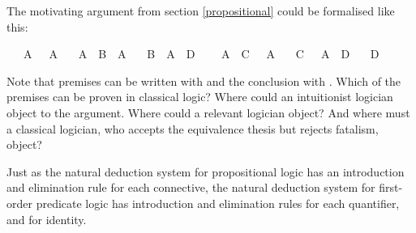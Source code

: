 \begin{isabellebody}
\begin{isamarkuptext}
\end{isamarkuptext}\isamarkuptrue%
%
\begin{isamarkuptext}%
\begin{Exercise}[title = The Air Raid] The motivating argument from section \ref{propositional} could be formalised like this: \end{Exercise}%
\end{isamarkuptext}\isamarkuptrue%
\isamarkupfalse%
\isanewline
\ \ \ {\isachardoublequoteopen}A\ {\isasymor}\ {\isasymnot}\ A{\isachardoublequoteclose}\isanewline
\ \ \ {\isachardoublequoteopen}A\ {\isasymlongrightarrow}\ B\ {\isasymlongrightarrow}\ A{\isachardoublequoteclose}\isanewline
\ \ \ {\isachardoublequoteopen}{\isacharparenleft}B\ {\isasymlongrightarrow}\ A{\isacharparenright}\ {\isasymlongrightarrow}\ D{\isachardoublequoteclose}\isanewline
\ \ \ {\isachardoublequoteopen}{\isasymnot}\ A\ {\isasymlongrightarrow}\ C\ {\isasymlongrightarrow}\ {\isasymnot}\ A{\isachardoublequoteclose}\isanewline
\ \ \ {\isachardoublequoteopen}{\isacharparenleft}C\ {\isasymlongrightarrow}\ {\isasymnot}\ A{\isacharparenright}\ {\isasymlongrightarrow}\ D{\isachardoublequoteclose}\isanewline
\ \ \ {\isachardoublequoteopen}D{\isachardoublequoteclose}%
\isadelimproof
\ %
\endisadelimproof
%
\isatagproof
{}\isamarkupfalse%
%
\endisatagproof
{\isafoldproof}%
%
\isadelimproof
%
\endisadelimproof
%
\begin{isamarkuptext}%
Note that premises can be written with  and the conclusion with .
Which of the premises can be proven in classical logic? Where could an intuitionist logician object to
the argument. Where could a relevant logician object? And where must a classical logician, who accepts
the equivalence thesis but rejects fatalism, object?%
\end{isamarkuptext}\isamarkuptrue%
%
\isamarkuptrue%
%
\begin{isamarkuptext}%
Just as the natural deduction system for propositional logic has an introduction and elimination 
rule for each connective, the natural deduction system for first-order predicate logic has introduction and elimination
rules for each quantifier, and for identity.%
\end{isamarkuptext}\isamarkuptrue%
%
\isamarkuptrue%
%
\begin{isamarkuptext}%

\end{isamarkuptext}
\end{isabellebody}
